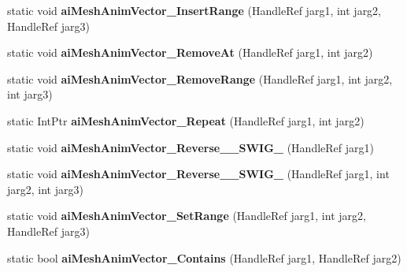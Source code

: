 \begin{DoxyCompactItemize}
\item 
\hypertarget{class_assimp_p_i_n_v_o_k_e_ab8029437939997e1e7382327ac63a436}{static void {\bfseries ai\+Mesh\+Anim\+Vector\+\_\+\+Insert\+Range} (Handle\+Ref jarg1, int jarg2, Handle\+Ref jarg3)}\label{class_assimp_p_i_n_v_o_k_e_ab8029437939997e1e7382327ac63a436}

\item 
\hypertarget{class_assimp_p_i_n_v_o_k_e_a8ea55afa914155f0372c267f14d396c6}{static void {\bfseries ai\+Mesh\+Anim\+Vector\+\_\+\+Remove\+At} (Handle\+Ref jarg1, int jarg2)}\label{class_assimp_p_i_n_v_o_k_e_a8ea55afa914155f0372c267f14d396c6}

\item 
\hypertarget{class_assimp_p_i_n_v_o_k_e_a82505a44f9304f70ab8dd5a54b33f519}{static void {\bfseries ai\+Mesh\+Anim\+Vector\+\_\+\+Remove\+Range} (Handle\+Ref jarg1, int jarg2, int jarg3)}\label{class_assimp_p_i_n_v_o_k_e_a82505a44f9304f70ab8dd5a54b33f519}

\item 
\hypertarget{class_assimp_p_i_n_v_o_k_e_a6bad2ce4e943ae9def95b9479531e5f1}{static Int\+Ptr {\bfseries ai\+Mesh\+Anim\+Vector\+\_\+\+Repeat} (Handle\+Ref jarg1, int jarg2)}\label{class_assimp_p_i_n_v_o_k_e_a6bad2ce4e943ae9def95b9479531e5f1}

\item 
\hypertarget{class_assimp_p_i_n_v_o_k_e_a21cbcd348cb784ec68a8eea955020e8f}{static void {\bfseries ai\+Mesh\+Anim\+Vector\+\_\+\+Reverse\+\_\+\+\_\+\+S\+W\+I\+G\+\_} (Handle\+Ref jarg1)}\label{class_assimp_p_i_n_v_o_k_e_a21cbcd348cb784ec68a8eea955020e8f}

\item 
\hypertarget{class_assimp_p_i_n_v_o_k_e_a4e86843215a62700e08c37e2a9e52b31}{static void {\bfseries ai\+Mesh\+Anim\+Vector\+\_\+\+Reverse\+\_\+\+\_\+\+S\+W\+I\+G\+\_} (Handle\+Ref jarg1, int jarg2, int jarg3)}\label{class_assimp_p_i_n_v_o_k_e_a4e86843215a62700e08c37e2a9e52b31}

\item 
\hypertarget{class_assimp_p_i_n_v_o_k_e_a07277ee161929aef6e7bab5754ea5bfc}{static void {\bfseries ai\+Mesh\+Anim\+Vector\+\_\+\+Set\+Range} (Handle\+Ref jarg1, int jarg2, Handle\+Ref jarg3)}\label{class_assimp_p_i_n_v_o_k_e_a07277ee161929aef6e7bab5754ea5bfc}

\item 
\hypertarget{class_assimp_p_i_n_v_o_k_e_a8bf1350fb7d0337bf3ac5c7a59a5ed51}{static bool {\bfseries ai\+Mesh\+Anim\+Vector\+\_\+\+Contains} (Handle\+Ref jarg1, Handle\+Ref jarg2)}\label{class_assimp_p_i_n_v_o_k_e_a8bf1350fb7d0337bf3ac5c7a59a5ed51}


\end{DoxyCompactItemize}

